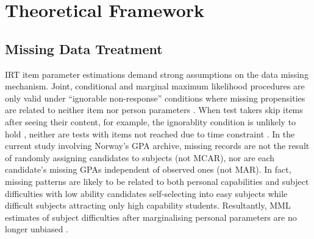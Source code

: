 \section{Theoretical Framework}


\subsection{Missing Data Treatment}

IRT item parameter estimations demand strong assumptions on the data missing mechanism. Joint, conditional and marginal maximum likelihood procedures are only valid under ``ignorable non-response'' conditions where missing propensities are related to neither item nor person parameters \parencite{molenaar:1995}. When test takers skip items after seeing their content, for example, the ignorablity condition is unlikely to hold \parencite{mislevy:1987}, neither are tests with items not reached due to time constraint \parencite{lord:1974, lord:1983}. In the current study involving Norway's GPA archive, missing records are not the result of randomly assigning candidates to subjects (not MCAR), nor are each candidate's missing GPAs independent of observed ones (not MAR). In fact, missing patterns are likely to be related to both personal capabilities and subject difficulties with low ability candidates self-selecting into easy subjects while difficult subjects attracting only high capability students. Resultantly, MML estimates of subject difficulties after marginalising personal parameters are no longer unbiased \parencite[][Table 2]{mislevy:1988}.

